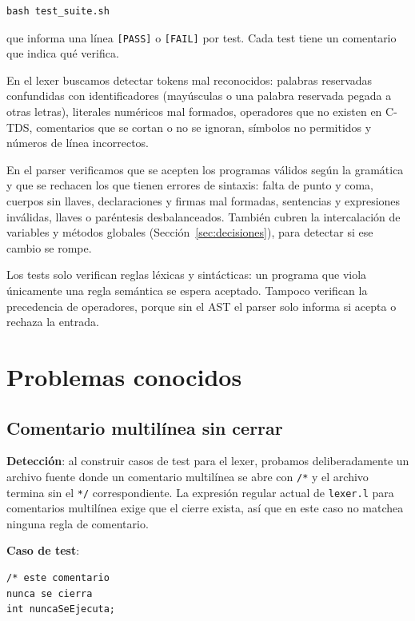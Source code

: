 \documentclass[11pt,a4paper]{article}
\begin{document}
\begin{verbatim}
bash test_suite.sh
\end{verbatim}

\noindent que informa una línea \texttt{[PASS]} o \texttt{[FAIL]} por test.
Cada test tiene un comentario que indica qué verifica.

En el lexer buscamos detectar tokens mal reconocidos: palabras reservadas
confundidas con identificadores (mayúsculas o una palabra reservada pegada a
otras letras), literales numéricos mal formados, operadores que no existen en
C-TDS, comentarios que se cortan o no se ignoran, símbolos no permitidos y
números de línea incorrectos.

En el parser verificamos que se acepten los programas válidos según la
gramática y que se rechacen los que tienen errores de sintaxis: falta de punto
y coma, cuerpos sin llaves, declaraciones y firmas mal formadas, sentencias y
expresiones inválidas, llaves o paréntesis desbalanceados. También cubren la
intercalación de variables y métodos globales (Sección~\ref{sec:decisiones}),
para detectar si ese cambio se rompe.

Los tests solo verifican reglas léxicas y sintácticas: un programa que viola
únicamente una regla semántica se espera aceptado. Tampoco verifican la
precedencia de operadores, porque sin el AST el parser solo informa si acepta
o rechaza la entrada.

\section{Problemas conocidos}
\label{sec:problemas}

\subsection{Comentario multilínea sin cerrar}

\textbf{Detección}: al construir casos de test para el lexer, probamos
deliberadamente un archivo fuente donde un comentario multilínea se abre con
\texttt{/*} y el archivo termina sin el \texttt{*/} correspondiente. La
expresión regular actual de \texttt{lexer.l} para comentarios multilínea
exige que el cierre exista, así que en este caso no matchea ninguna regla de
comentario.

\textbf{Caso de test}:
\begin{verbatim}
/* este comentario
nunca se cierra
int nuncaSeEjecuta;
\end{verbatim}
\end{document}
